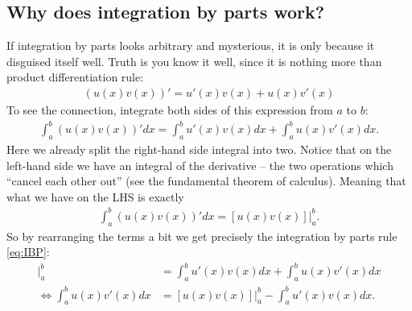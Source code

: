 \documentclass{article}
\begin{document}
\subsection{Why does integration by parts work?}

If integration by parts looks arbitrary and mysterious, it is only because it disguised itself well. Truth is you know it well, since it is nothing more than product differentiation rule:
\begin{align*}
	\left( u(x)v(x) \right)' = u'(x) v(x) + u(x) v'(x)
\end{align*}
To see the connection, integrate both sides of this expression from $a$ to $b$:
\begin{align*}
	\int_a^b \left( u(x)v(x) \right)' dx = \int_a^b u'(x) v(x) dx + \int_a^b u(x) v'(x) dx.
\end{align*}
Here we already split the right-hand side integral into two. Notice that on the left-hand side we have an integral of the derivative -- the two operations which ``cancel each other out'' (see the fundamental theorem of calculus). Meaning that what we have on the LHS is exactly
\begin{align*}
	\int_a^b \left( u(x)v(x) \right)' dx = [u(x)v(x)]|_a^b.
\end{align*}
So by rearranging the terms a bit we get precisely the integration by parts rule \eqref{eq:IBP}:
\begin{align*}
	[u(x)v(x)]|_a^b &= \int_a^b u'(x) v(x) dx + \int_a^b u(x) v'(x) dx
	\\
	\Leftrightarrow \int_a^b u(x) v'(x) dx &= [u(x)v(x)]|_a^b - \int_a^b u'(x) v(x) dx.
\end{align*}




%
%
\end{document}
